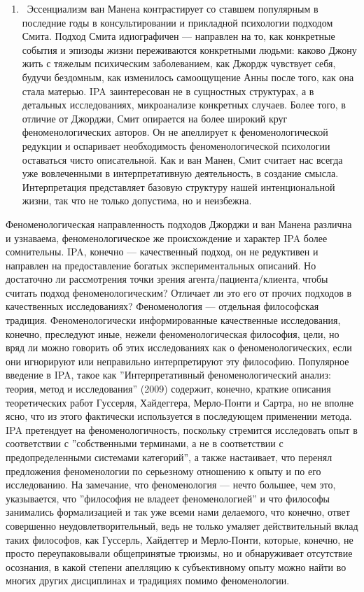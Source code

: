 \documentclass[11pt]{book}
\begin{document}
\begin{enumerate}
  \item\ Эссенциализм ван Манена контрастирует со ставшем популярным в последние годы в консультировании и прикладной психологии подходом Смита. Подход Смита идиографичен --- направлен на то, как конкретные события и эпизоды жизни переживаются конкретными людьми: каково Джону жить с тяжелым психическим заболеванием, как Джордж чувствует себя, будучи бездомным, как изменилось самоощущение Анны после того, как она стала матерью. IPA заинтересован не в сущностных структурах, а в детальных исследованиях, микроанализе конкретных случаев. Более того, в отличие от Джорджи, Смит опирается на более широкий круг феноменологических авторов. Он не апеллирует к феноменологической редукции и оспаривает необходимость феноменологической психологии оставаться чисто описательной. Как и ван Манен, Смит считает нас всегда уже вовлеченными в интерпретативную деятельность, в создание смысла. Интерпретация представляет базовую структуру нашей интенциональной жизни, так что не только допустима, но и неизбежна.

\end{enumerate}

Феноменологическая направленность подходов Джорджи и ван Манена различна и узнаваема, феноменологическое же происхождение и характер IPA более сомнительны. IPA, конечно --- качественный подход, он не редуктивен и направлен на предоставление богатых экспериментальных описаний. Но достаточно ли рассмотрения точки зрения агента/пациента/клиента, чтобы считать подход феноменологическим? Отличает ли это его от прочих подходов в качественных исследованиях? Феноменология --- отдельная философская традиция. Феноменологически информированные качественные исследования, конечно, преследуют иные, нежели феноменологическая философия, цели, но вряд ли можно говорить об этих исследованиях как о феноменологических, если они игнорируют или неправильно интерпретируют эту философию. Популярное введение в IPA, такое как ''Интерпретативный феноменологический анализ: теория, метод и исследования'' (2009) содержит, конечно, краткие описания теоретических работ Гуссерля, Хайдеггера, Мерло-Понти и Сартра, но не вполне ясно, что из этого фактически используется в последующем применении метода. IPA претендует на феноменологичность, поскольку стремится исследовать опыт в соответствии с ''собственными терминами, а не в соответствии с предопределенными системами категорий'', а также настаивает, что перенял предложения феноменологии по серьезному отношению к опыту и по его исследованию. На замечание, что феноменология --- нечто большее, чем это, указывается, что ''философия не владеет феноменологией'' и что философы занимались формализацией и так уже всеми нами делаемого, что конечно, ответ совершенно неудовлетворительный, ведь не только умаляет действительный вклад таких философов, как Гуссерль, Хайдеггер и Мерло-Понти, которые, конечно, не просто переупаковывали общепринятые трюизмы, но и обнаруживает отсутствие осознания, в какой степени апелляцию к субъективному опыту можно найти во многих других дисциплинах и традициях помимо феноменологии.
\end{document}
